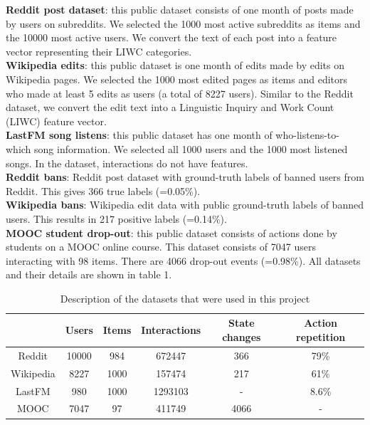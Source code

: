 \textbf{Reddit\supercite{Reddit} post dataset}: this public dataset consists of one month of posts made by users on subreddits. We selected the 1000 most active subreddits as items and the 10000 most active users. We convert the text of each post into a feature vector representing their LIWC categories.\\
\textbf{Wikipedia\supercite{Wiki} edits}: this public dataset is one month of edits made by edits on Wikipedia pages. We selected the 1000 most edited pages as items and editors who made at least 5 edits as users (a total of 8227 users). Similar to the Reddit dataset, we convert the edit text into a Linguistic Inquiry and Work Count\supercite{pennebaker01LIWC} (LIWC) feature vector.\\
\textbf{LastFM\supercite{10.1007/978-3-642-33486-3_5lastFM} song listens}: this public dataset has one month of who-listens-to-which song information. We selected all 1000 users and the 1000 most listened songs. In the dataset, interactions do not have features.\\
\textbf{Reddit bans}: Reddit post dataset with ground-truth labels of banned users from Reddit. This gives 366 true labels (=0.05\%).\\
\textbf{Wikipedia bans}: Wikipedia edit data with public ground-truth labels of banned users. This results in 217 positive labels (=0.14\%).\\
\textbf{MOOC\supercite{mooc} student drop-out}: this public dataset consists of actions done by students on a MOOC online course. This dataset consists of 7047 users interacting with 98 items. There are 4066 drop-out events (=0.98\%). All datasets and their details are shown in table 1. \\

\begin{table}[H]
    \centering
    \begin{tabular}{|c|c|c|c|c|c|}
        \cline{2-6} \multicolumn{1}{c|}{} & Users & Items & Interactions & State changes & Action repetition \\\hline
        Reddit & 10000 & 984 & 672447 & 366 & 79\% \\\hline
        Wikipedia & 8227 & 1000 & 157474 & 217 & 61\% \\\hline
        LastFM & 980 & 1000 & 1293103 & - & 8.6\% \\\hline
        MOOC & 7047 & 97 & 411749 & 4066 & - \\\hline
    \end{tabular}
    \caption{Description of the datasets that were used in this project}
\end{table}

